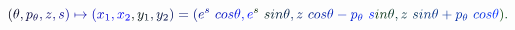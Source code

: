 \documentclass[12pt]{article}
\begin{document}
\makeatletter
\renewcommand*{\@textcolor}[3]{%
  \protect\leavevmode
  \begingroup
    \color#1{#2}#3%
  \endgroup
}
\makeatother
\begin{displaymath}
\mathcolor[RGB]{0,0,15}{(} \mathcolor[RGB]{0,0,30}{\theta} \mathcolor[RGB]{0,0,45}{,} \mathcolor[RGB]{0,0,60}{p} _ { \mathcolor[RGB]{0,0,75}{\theta} } \mathcolor[RGB]{0,0,90}{,} \mathcolor[RGB]{0,0,105}{z} \mathcolor[RGB]{0,0,120}{,} \mathcolor[RGB]{0,0,135}{s} \mathcolor[RGB]{0,0,150}{)} \mathcolor[RGB]{0,0,165}{\mapsto} \mathcolor[RGB]{0,0,180}{(} \mathcolor[RGB]{0,0,195}{x} _ { \mathcolor[RGB]{0,0,210}{1} } \mathcolor[RGB]{0,0,225}{,} \mathcolor[RGB]{0,0,240}{x} _ { \mathcolor[RGB]{0,0,255}{2} } \mathcolor[RGB]{0,15,0}{,} \mathcolor[RGB]{0,15,15}{y} _ { \mathcolor[RGB]{0,15,30}{1} } \mathcolor[RGB]{0,15,45}{,} \mathcolor[RGB]{0,15,60}{y} _ { \mathcolor[RGB]{0,15,75}{2} } \mathcolor[RGB]{0,15,90}{)} \mathcolor[RGB]{0,15,105}{=} \mathcolor[RGB]{0,15,120}{(} \mathcolor[RGB]{0,15,135}{e} ^ { \mathcolor[RGB]{0,15,150}{s} } \mathcolor[RGB]{0,15,165}{\operatorname*} { \mathcolor[RGB]{0,15,180}{c} \mathcolor[RGB]{0,15,195}{o} \mathcolor[RGB]{0,15,210}{s} } \mathcolor[RGB]{0,15,225}{\theta} \mathcolor[RGB]{0,15,240}{,} \mathcolor[RGB]{0,15,255}{e} ^ { \mathcolor[RGB]{0,30,0}{s} } \mathcolor[RGB]{0,30,15}{\operatorname*} { \mathcolor[RGB]{0,30,30}{s} \mathcolor[RGB]{0,30,45}{i} \mathcolor[RGB]{0,30,60}{n} } \mathcolor[RGB]{0,30,75}{\theta} \mathcolor[RGB]{0,30,90}{,} \mathcolor[RGB]{0,30,105}{z} \mathcolor[RGB]{0,30,120}{\operatorname*} { \mathcolor[RGB]{0,30,135}{c} \mathcolor[RGB]{0,30,150}{o} \mathcolor[RGB]{0,30,165}{s} } \mathcolor[RGB]{0,30,180}{\theta} \mathcolor[RGB]{0,30,195}{-} \mathcolor[RGB]{0,30,210}{p} _ { \mathcolor[RGB]{0,30,225}{\theta} } \mathcolor[RGB]{0,30,240}{\operatorname*} { \mathcolor[RGB]{0,30,255}{s} \mathcolor[RGB]{0,45,0}{i} \mathcolor[RGB]{0,45,15}{n} } \mathcolor[RGB]{0,45,30}{\theta} \mathcolor[RGB]{0,45,45}{,} \mathcolor[RGB]{0,45,60}{z} \mathcolor[RGB]{0,45,75}{\operatorname*} { \mathcolor[RGB]{0,45,90}{s} \mathcolor[RGB]{0,45,105}{i} \mathcolor[RGB]{0,45,120}{n} } \mathcolor[RGB]{0,45,135}{\theta} \mathcolor[RGB]{0,45,150}{+} \mathcolor[RGB]{0,45,165}{p} _ { \mathcolor[RGB]{0,45,180}{\theta} } \mathcolor[RGB]{0,45,195}{\operatorname*} { \mathcolor[RGB]{0,45,210}{c} \mathcolor[RGB]{0,45,225}{o} \mathcolor[RGB]{0,45,240}{s} } \mathcolor[RGB]{0,45,255}{\theta} \mathcolor[RGB]{0,60,0}{)} \mathcolor[RGB]{0,60,15}{.}
\end{displaymath}
\end{document}
